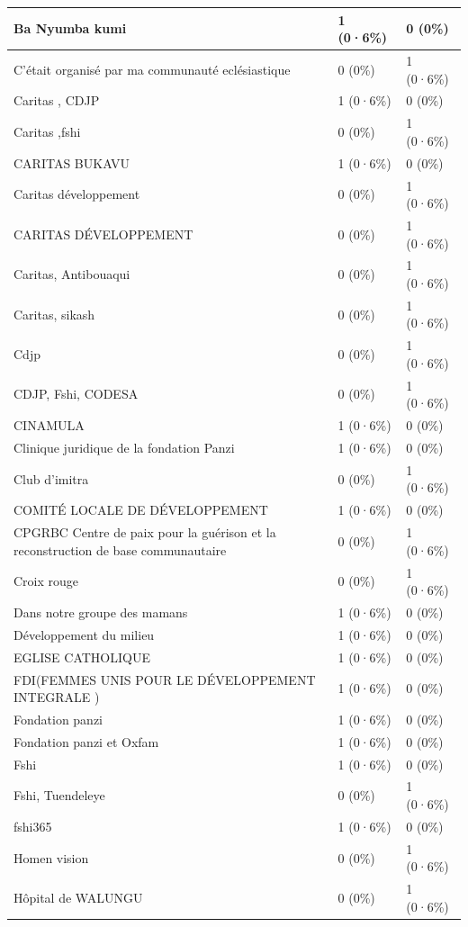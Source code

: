\documentclass[
]{book}
\begin{document}
\begin{tabular}{l|l|l}
\hline
Ba Nyumba kumi & 1 (0·6\%) & 0 (0\%)\\
\hline
C'était organisé par ma communauté eclésiastique & 0 (0\%) & 1 (0·6\%)\\
\hline
Caritas , CDJP & 1 (0·6\%) & 0 (0\%)\\
\hline
Caritas ,fshi & 0 (0\%) & 1 (0·6\%)\\
\hline
CARITAS BUKAVU & 1 (0·6\%) & 0 (0\%)\\
\hline
Caritas développement & 0 (0\%) & 1 (0·6\%)\\
\hline
CARITAS DÉVELOPPEMENT & 0 (0\%) & 1 (0·6\%)\\
\hline
Caritas, Antibouaqui & 0 (0\%) & 1 (0·6\%)\\
\hline
Caritas, sikash & 0 (0\%) & 1 (0·6\%)\\
\hline
Cdjp & 0 (0\%) & 1 (0·6\%)\\
\hline
CDJP, Fshi, CODESA & 0 (0\%) & 1 (0·6\%)\\
\hline
CINAMULA & 1 (0·6\%) & 0 (0\%)\\
\hline
Clinique juridique de la fondation Panzi & 1 (0·6\%) & 0 (0\%)\\
\hline
Club d'imitra & 0 (0\%) & 1 (0·6\%)\\
\hline
COMITÉ LOCALE DE DÉVELOPPEMENT & 1 (0·6\%) & 0 (0\%)\\
\hline
CPGRBC Centre de paix pour la guérison et la reconstruction de base communautaire & 0 (0\%) & 1 (0·6\%)\\
\hline
Croix rouge & 0 (0\%) & 1 (0·6\%)\\
\hline
Dans notre groupe des mamans & 1 (0·6\%) & 0 (0\%)\\
\hline
Développement du milieu & 1 (0·6\%) & 0 (0\%)\\
\hline
EGLISE CATHOLIQUE & 1 (0·6\%) & 0 (0\%)\\
\hline
FDI(FEMMES UNIS POUR LE DÉVELOPPEMENT INTEGRALE ) & 1 (0·6\%) & 0 (0\%)\\
\hline
Fondation panzi & 1 (0·6\%) & 0 (0\%)\\
\hline
Fondation panzi et Oxfam & 1 (0·6\%) & 0 (0\%)\\
\hline
Fshi & 1 (0·6\%) & 0 (0\%)\\
\hline
Fshi, Tuendeleye & 0 (0\%) & 1 (0·6\%)\\
\hline
fshi365 & 1 (0·6\%) & 0 (0\%)\\
\hline
Homen vision & 0 (0\%) & 1 (0·6\%)\\
\hline
Hôpital de WALUNGU & 0 (0\%) & 1 (0·6\%)\\

\end{tabular}
\end{document}
